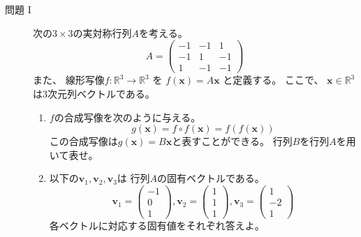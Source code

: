 \documentclass[12pt,b5paper]{ltjsarticle}
\begin{document}
\hrulefill

\begin{description}
 \item [問題 I]
       次の$3 \times 3$の実対称行列$A$を考える。
             \begin{equation}
              A=
               \begin{pmatrix}
                -1 & -1 & 1 \\
                -1 & 1 & -1 \\
                1 & -1 & -1
               \end{pmatrix}
             \end{equation}
       また、
       線形写像$f:\mathbb{R}^{3}\to\mathbb{R}^{3}$ を $f(\bm{x})=A\bm{x}$
       と定義する。
       ここで、
       $\bm{x}\in\mathbb{R}^{3}$は3次元列ベクトルである。

       \begin{enumerate}
        \item
             $f$の合成写像を次のように与える。
             \begin{equation}
              g(\bm{x}) = f\circ f (\bm{x}) = f\left( f (\bm{x})\right)
             \end{equation}
             この合成写像は$g(\bm{x})=B\bm{x}$と表すことができる。
             行列$B$を行列$A$を用いて表せ。

        \item \label{enu:eigenvec}
             以下の$\bm{v}_{1},\bm{v}_{2},\bm{v}_{3}$は
              行列$A$の固有ベクトルである。
             \begin{equation}
              \bm{v}_{1}= \begin{pmatrix} -1 \\ 0 \\ 1 \end{pmatrix},
              \bm{v}_{2}= \begin{pmatrix} 1 \\ 1 \\ 1 \end{pmatrix},
              \bm{v}_{3}= \begin{pmatrix} 1 \\ -2 \\ 1 \end{pmatrix}
             \end{equation}
             各ベクトルに対応する固有値をそれぞれ答えよ。


\end{enumerate}
\end{description}
\end{document}
